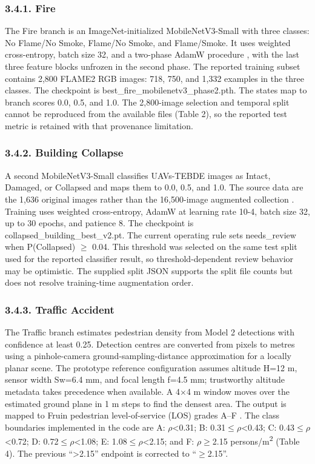 \documentclass[pdflatex,sn-mathphys-ay]{sn-jnl}
\begin{document}
\subsubsection*{3.4.1. Fire}

The Fire branch is an ImageNet-initialized MobileNetV3-Small \cite{ref11} with three classes: No Flame/No Smoke, Flame/No Smoke, and Flame/Smoke. It uses weighted cross-entropy, batch size 32, and a two-phase AdamW procedure \cite{ref22}, with the last three feature blocks unfrozen in the second phase. The reported training subset contains 2,800 FLAME2 RGB images: 718, 750, and 1,332 examples in the three classes. The checkpoint is best\_fire\_mobilenetv3\_phase2.pth. The states map to branch scores 0.0, 0.5, and 1.0. The 2,800-image selection and temporal split cannot be reproduced from the available files (Table 2), so the reported test metric is retained with that provenance limitation.

\subsubsection*{3.4.2. Building Collapse}

A second MobileNetV3-Small classifies UAVs-TEBDE images as Intact, Damaged, or Collapsed and maps them to 0.0, 0.5, and 1.0. The source data are the 1,636 original images rather than the 16,500-image augmented collection \cite{ref10}. Training uses weighted cross-entropy, AdamW at learning rate 10-4, batch size 32, up to 30 epochs, and patience 8. The checkpoint is collapsed\_building\_best\_v2.pt. The current operating rule sets needs\_review when P(Collapsed) $\geq$ 0.04. This threshold was selected on the same test split used for the reported classifier result, so threshold-dependent review behavior may be optimistic. The supplied split JSON supports the split file counts but does not resolve training-time augmentation order.

\subsubsection*{3.4.3. Traffic Accident}

The Traffic branch estimates pedestrian density from Model 2 detections with confidence at least 0.25. Detection centres are converted from pixels to metres using a pinhole-camera ground-sampling-distance approximation for a locally planar scene. The prototype reference configuration assumes altitude H=12 m, sensor width Sw=6.4 mm, and focal length f=4.5 mm; trustworthy altitude metadata takes precedence when available. A 4$\times$4 m window moves over the estimated ground plane in 1 m steps to find the densest area. The output is mapped to Fruin pedestrian level-of-service (LOS) grades A--F \cite{ref12}. The class boundaries implemented in the code are A: $\rho$\textless{}0.31; B: 0.31$\leq$$\rho$\textless{}0.43; C: 0.43$\leq$$\rho$\textless{}0.72; D: 0.72$\leq$$\rho$\textless{}1.08; E: 1.08$\leq$$\rho$\textless{}2.15; and F: $\rho$$\geq$2.15 persons/m\textsuperscript{2} (Table 4). The previous ``\textgreater{}2.15'' endpoint is corrected to ``$\geq$2.15''.
\end{document}
